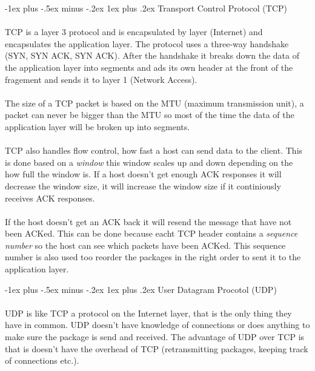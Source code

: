\documentclass[10pt,landscape]{article}
\makeatletter
\renewcommand{\subsubsection}{\@startsection{subsubsection}{3}{0mm}%
                                {-1ex plus -.5ex minus -.2ex}%
                                {1ex plus .2ex}%
                                {\normalfont\small\bfseries}}
\makeatother
\begin{document}
\begin{multicols}{3}
\subsubsection{Transport Control Protocol (TCP)}
\paragraph{}
TCP is a layer 3 protocol and is encapsulated by layer (Internet) and encapsulates the application layer. The protocol
uses a three-way handshake (SYN, SYN ACK, SYN ACK). After the handshake it breaks down the data of the application layer
into segments and ads its own header at the front of the fragement and sends it to layer 1 (Network Access).
\paragraph{}
The size of a TCP packet is based on the MTU (maximum transmission unit), a packet can never be bigger than the MTU
so most of the time the data of the application layer will be broken up into segments.
\paragraph{}
TCP also handles flow control, how fast a host can send data to the client. This is done based on a \textit{window}
this window scales up and down depending on the how full the window is. If a host doesn't get enough ACK responses
it will decrease the window size, it will increase the window size if it continiously receives ACK responses.
\paragraph{}
If the host doesn't get an ACK back it will resend the message that have not been ACKed. This can be done because
eacht TCP header contains a \textit{sequence number} so the host can see which packets have been ACKed. This sequence number
is also used too reorder the packages in the right order to sent it to the application layer.

\subsubsection{User Datagram Procotol (UDP)}
\paragraph{}UDP is like TCP a protocol on the Internet layer, that is the only thing they have in common. UDP doesn't have knowledge of
connections or does anything to make sure the package is send and received. The advantage of UDP over TCP is that is doesn't
have the overhead of TCP (retransmitting packages, keeping track of connections etc.).


\end{multicols}
\end{document}
